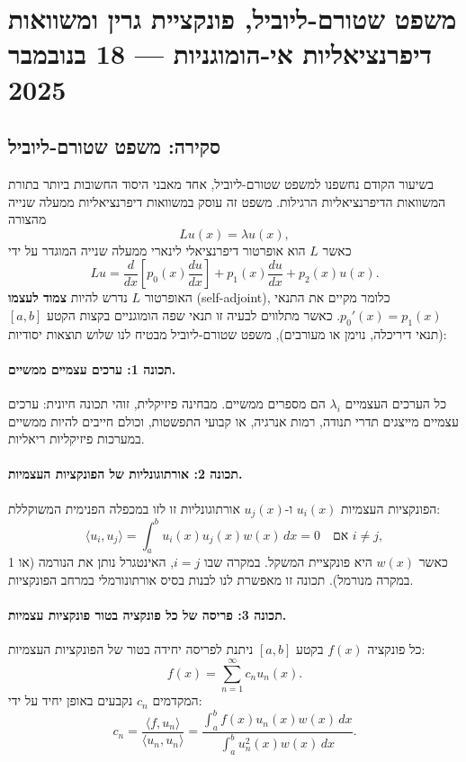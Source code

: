 \section{משפט שטורם-ליוביל, פונקציית גרין ומשוואות דיפרנציאליות אי-הומוגניות — 18 בנובמבר 2025}

\subsection*{סקירה: משפט שטורם-ליוביל}

בשיעור הקודם נחשפנו למשפט שטורם-ליוביל, אחד מאבני היסוד החשובות ביותר בתורת המשוואות הדיפרנציאליות הרגילות. משפט זה עוסק במשוואות דיפרנציאליות ממעלה שנייה מהצורה
\[
L u(x) = \lambda u(x),
\]
כאשר \(L\) הוא אופרטור דיפרנציאלי לינארי ממעלה שנייה המוגדר על ידי
\[
L u = \frac{d}{dx}\left[p_0(x) \frac{du}{dx}\right] + p_1(x) \frac{du}{dx} + p_2(x) u(x).
\]
האופרטור \(L\) נדרש להיות \textbf{צמוד לעצמו} (self-adjoint), כלומר מקיים את התנאי \(p_0'(x) = p_1(x)\). כאשר מתלווים לבעיה זו תנאי שפה הומוגניים בקצות הקטע \([a,b]\) (תנאי דיריכלה, נוימן או מעורבים), משפט שטורם-ליוביל מבטיח לנו שלוש תוצאות יסודיות:

\paragraph{תכונה 1: ערכים עצמיים ממשיים.}
כל הערכים העצמיים \(\lambda_i\) הם מספרים ממשיים. מבחינה פיזיקלית, זוהי תכונה חיונית: ערכים עצמיים מייצגים תדרי תנודה, רמות אנרגיה, או קבועי התפשטות, וכולם חייבים להיות ממשיים במערכות פיזיקליות ריאליות.

\paragraph{תכונה 2: אורתוגונליות של הפונקציות העצמיות.}
הפונקציות העצמיות \(u_i(x)\) ו-\(u_j(x)\) אורתוגונליות זו לזו במכפלה הפנימית המשוקללת:
\[
\langle u_i, u_j \rangle = \int_a^b u_i(x) u_j(x) w(x) \, dx = 0 \quad \text{אם } i \neq j,
\]
כאשר \(w(x)\) היא פונקציית המשקל. במקרה שבו \(i = j\), האינטגרל נותן את הנורמה (או 1 במקרה מנורמל). תכונה זו מאפשרת לנו לבנות בסיס אורתונורמלי במרחב הפונקציות.

\paragraph{תכונה 3: פריסה של כל פונקציה בטור פונקציות עצמיות.}
כל פונקציה \(f(x)\) בקטע \([a,b]\) ניתנת לפריסה יחידה בטור של הפונקציות העצמיות:
\[
f(x) = \sum_{n=1}^\infty c_n u_n(x).
\]
המקדמים \(c_n\) נקבעים באופן יחיד על ידי:
\[
c_n = \frac{\langle f, u_n \rangle}{\langle u_n, u_n \rangle} = \frac{\int_a^b f(x) u_n(x) w(x) \, dx}{\int_a^b u_n^2(x) w(x) \, dx}.
\]

